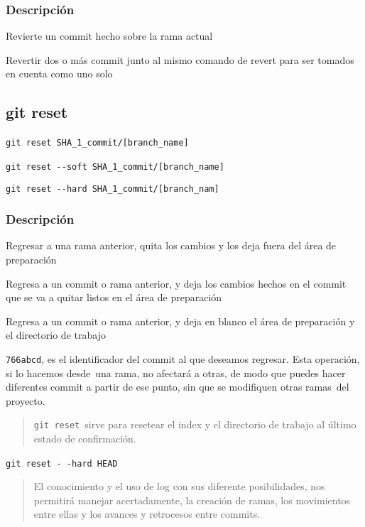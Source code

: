 \documentclass[
  a2paper,
]{article}
\begin{document}
\hypertarget{descripciuxf3n-3}{%
\subsubsection{Descripción}\label{descripciuxf3n-3}}

Revierte un commit hecho sobre la rama actual~~

Revertir dos o más commit junto al mismo comando de revert para ser
tomados en cuenta como uno solo

\hypertarget{git-reset}{%
\subsection{git reset}\label{git-reset}}

\texttt{git\ reset\ SHA\_1\_commit/{[}branch\_name{]}}~~

\texttt{git\ reset\ -\/-soft\ SHA\_1\_commit/{[}branch\_name{]}}~~

\texttt{git\ reset\ -\/-hard\ SHA\_1\_commit/{[}branch\_nam{]}}

\hypertarget{descripciuxf3n-4}{%
\subsubsection{Descripción}\label{descripciuxf3n-4}}

Regresar a una rama anterior, quita los cambios y los deja fuera del
área de preparación~~

Regresa a un commit o rama anterior, y deja los cambios hechos en el
commit que se va a quitar listos en el área de preparación~~

Regresa a un commit o rama anterior, y deja en blanco el área de
preparación y el directorio de trabajo~~

\texttt{766abcd}, es el identificador del commit al que deseamos
regresar. Esta operación, si lo hacemos desde \,una rama, no afectará a
otras, de modo que puedes hacer diferentes commit a partir de ese punto,
sin que se modifiquen otras ramas\, del proyecto.

\begin{quote}
\texttt{git\ reset}~sirve para resetear el index y el directorio de
trabajo al último estado de confirmación.
\end{quote}

\texttt{git\ reset\ -\ -hard\ HEAD}~~

\begin{quote}
El conocimiento y el uso de log con sus diferente posibilidades, nos
permitirá manejar acertadamente, la creación de ramas, los movimientos
entre ellas y los avances y retrocesos entre commits.
\end{quote}
\end{document}
